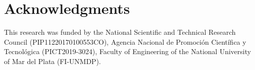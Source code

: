 \documentclass[lettersize,journal]{IEEEtran}
\begin{document}
\section*{Acknowledgments}

This research was funded by the National Scientific and Technical Research Council (PIP11220170100553CO), Agencia Nacional de Promoción Científica y Tecnológica (PICT2019-3024), Faculty of Engineering of the National University of Mar del Plata (FI-UNMDP).



\balance

\end{document}
